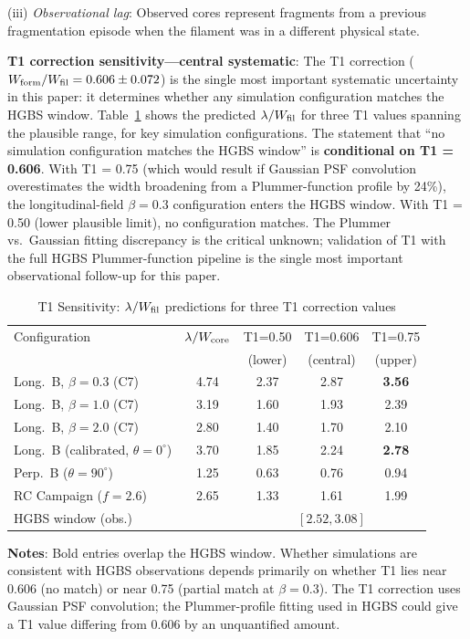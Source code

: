 \documentclass[twoside,twocolumn]{mnras}
\begin{document}
(iii) \textit{Observational lag}: Observed cores represent fragments from a previous
fragmentation episode when the filament was in a different physical state.

\textbf{T1 correction sensitivity---central systematic}: The T1 correction
($W_{\rm form}/W_{\rm fil} = 0.606 \pm 0.072$) is the single most important systematic
uncertainty in this paper: it determines whether any simulation configuration matches
the HGBS window. Table~\ref{tab:t1_budget} shows the predicted $\lambda/W_{\rm fil}$
for three T1 values spanning the plausible range, for key simulation configurations.
The statement that ``no simulation configuration matches the HGBS window'' is
\textbf{conditional on T1 = 0.606}. With T1 = 0.75 (which would result if Gaussian
PSF convolution overestimates the width broadening from a Plummer-function profile by
24\%), the longitudinal-field $\beta = 0.3$ configuration enters the HGBS window.
With T1 = 0.50 (lower plausible limit), no configuration matches. The Plummer vs.\
Gaussian fitting discrepancy is the critical unknown; validation of T1 with the full
HGBS Plummer-function pipeline is the single most important observational follow-up
for this paper.

\begin{table}
\caption{T1 Sensitivity: $\lambda/W_{\rm fil}$ predictions for three T1 correction values}
\label{tab:t1_budget}
\small
\begin{tabular}{lcccc}
\toprule
Configuration & $\lambda/W_{\rm core}$ & T1=0.50 & T1=0.606 & T1=0.75 \\
              &                       & (lower) & (central) & (upper) \\
\midrule
Long.\ B, $\beta=0.3$ (C7) & 4.74 & 2.37 & 2.87 & \textbf{3.56} \\
Long.\ B, $\beta=1.0$ (C7) & 3.19 & 1.60 & 1.93 & 2.39 \\
Long.\ B, $\beta=2.0$ (C7) & 2.80 & 1.40 & 1.70 & 2.10 \\
Long.\ B (calibrated, $\theta=0^\circ$) & 3.70 & 1.85 & 2.24 & \textbf{2.78} \\
Perp.\ B ($\theta=90^\circ$) & 1.25 & 0.63 & 0.76 & 0.94 \\
RC Campaign ($f=2.6$) & 2.65 & 1.33 & 1.61 & 1.99 \\
\midrule
\multicolumn{2}{l}{HGBS window (obs.)} & \multicolumn{3}{c}{$[2.52, 3.08]$} \\
\bottomrule
\end{tabular}
\vspace{2pt}
\footnotesize
\textbf{Notes}: Bold entries overlap the HGBS window. Whether simulations are consistent
with HGBS observations depends primarily on whether T1 lies near 0.606 (no match) or
near 0.75 (partial match at $\beta=0.3$). The T1 correction uses Gaussian PSF
convolution; the Plummer-profile fitting used in HGBS could give a T1 value
differing from 0.606 by an unquantified amount.
\end{table}
\end{document}
